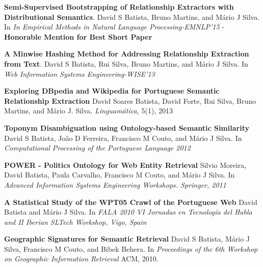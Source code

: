 
\vspace{-5.5mm}

\begin{cventries}

  \cventry
    {} %
    {} %
    {} %
    {} %
    {
      \begin{cvitems} %
        \item {{\bf Semi-Supervised Bootstrapping of Relationship Extractors with Distributional Semantics}. David S Batista, Bruno Martins, and Mário J Silva. In {\it In Empirical Methods in Natural Language Processing-EMNLP'15} - {\bf Honorable Mention for Best Short Paper}}
		\vspace{1.0mm}
		\item {{\bf A Minwise Hashing Method for Addressing Relationship Extraction from Text}. David S Batista, Rui Silva, Bruno Martins, and Mário J Silva. In {\it Web Information Systems Engineering-WISE'13}}
		\vspace{1.0mm}
		\item {{\bf Exploring DBpedia and Wikipedia for Portuguese Semantic Relationship Extraction} David Soares Batista, David Forte, Rui Silva, Bruno Martins, and Mário J. Silva. {\it Linguamática,} 5(1), 2013}
		\vspace{1.0mm}
		\item {{\bf Toponym Disambiguation using Ontology-based Semantic Similarity} David S Batista, João D Ferreira, Francisco M Couto, and Mário J Silva. In {\it Computational Processing of the Portuguese Language 2012}}
		\vspace{1.0mm}
		\item {{\bf POWER - Politics Ontology for Web Entity Retrieval} Silvio Moreira, David Batista, Paula Carvalho, Francisco M Couto, and Mário J Silva. In {\it Advanced Information Systems Engineering Workshops. Springer, 2011}}
		\vspace{1.0mm}
		\item {{\bf A Statistical Study of the WPT05 Crawl of the Portuguese Web} David Batista and Mário J Silva. In {\it FALA 2010 VI Jornadas en Tecnología del Habla and II Iberian SLTech Workshop, Vigo, Spain}}
		\vspace{1.0mm}
		\item {{\bf Geographic Signatures for Semantic Retrieval} David S Batista, Mário J Silva, Francisco M Couto, and Bibek Behera. In {\it Proceedings of the 6th Workshop on Geographic Information Retrieval} ACM, 2010.}		
      \end{cvitems}
    }
\end{cventries}



\begin{comment}
\begin{cventries}

\cventry
    {X} %
    {X} %
    {X} %
    {X} %
	{
		\begin{cvitems}

			\item {\textbf{}. . \textit{}. - \textbf{}}






	\end{cvitems}
	}
\end{cventries}
\end{comment}